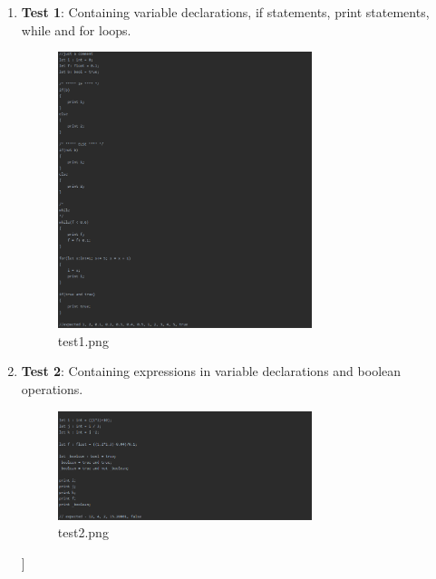 \documentclass{article}
\begin{document}
			\pagebreak
				\begin{enumerate}
				\item \textbf{Test 1}: Containing variable declarations, if statements, print statements, while and for loops.
								\begin{figure}[H]
					\centering
			 			\includegraphics[width=0.7\textwidth]{test1.png}
			 			\centering
			  			\caption{test1.png}
			  			\label{fig:test1}
					\end{figure}
					
					\item \textbf{Test 2}: Containing expressions in variable declarations and boolean operations.
					
					\begin{figure}[H]
					\centering
			 			\includegraphics[width=0.7\textwidth]{test2.png}
			 			\centering
			  			\caption{test2.png}
			  			\label{fig:test2}
					\end{figure}]
					

\end{enumerate}
\end{document}
